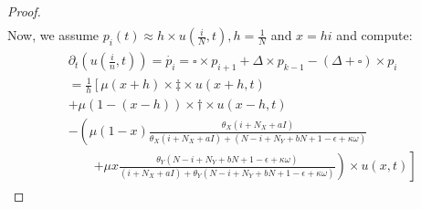 \documentclass[10pt,a4paper]{article}
\begin{document}
\begin{proof}
\begin{align*}
\end{align*}
Now, we assume $p_i(t) \approx h\times u\left(\frac{i}{N}, t\right), h=\frac{1}{N}$ and $x = hi$ and compute:
\begin{align}\label{computation}
\begin{split}
	&\partial_t \left(u\left(\frac{i}{n}, t\right)\right) = \dot{p_i} = \square\times p_{i+1} + \Delta\times p_{k-1} - \left(\Delta + \square\right)\times p_i\\
	&= \frac{1}{h}\left[\mu(x+h)\times \ddagger\times u\left(x+h,t\right)\right.\\
	&\left. + \mu(1-(x-h))\times \dagger \times u\left(x-h,t \right)\right.\\
	&\left.- \left(\mu(1-x)\frac{\theta_X (i + N_X + aI)}{\theta_X (i + N_X + aI) + (N-i + N_Y + bN + 1-\epsilon + \kappa\omega)}\right.\right.\\
		&\qquad \left.\left. + \mu x\frac{\theta_Y(N-i + N_Y + bN +1-\epsilon+\kappa\omega)}{(i + N_X+aI) + \theta_Y(N-i + N_Y + bN +1-\epsilon+\kappa\omega)} \right)\times u\left(x,t\right)\right]
		\end{split}
\end{align}


\end{proof}
\end{document}
